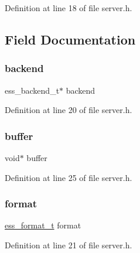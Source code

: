 Definition at line 18 of file server.\+h.



\subsection{Field Documentation}
\mbox{\label{structess__server_ab2b85d146ada2907a81371aace6e926d}} 
\subsubsection{\texorpdfstring{backend}{backend}}
{\footnotesize\ttfamily ess\+\_\+backend\+\_\+t$\ast$ backend}



Definition at line 20 of file server.\+h.

\mbox{\label{structess__server_a368f7094dc38acca20612bbb392552f4}} 
\subsubsection{\texorpdfstring{buffer}{buffer}}
{\footnotesize\ttfamily void$\ast$ buffer}



Definition at line 25 of file server.\+h.

\mbox{\label{structess__server_abb4395d1c05d3bbc2e1d011507ddd19b}} 
\subsubsection{\texorpdfstring{format}{format}}
{\footnotesize\ttfamily \hyperlink{ess__format_8h_ab03f24cb5d42f4448f713bf1ec178163}{ess\+\_\+format\+\_\+t} format}



Definition at line 21 of file server.\+h.

\mbox{\label{structess__server_aad01339e89106fdf68f57ef118956fa9}} 
